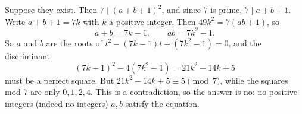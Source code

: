 Suppose they exist. Then $7\mid(a+b+1)^2$, and since $7$ is prime, $7\mid a+b+1$. Write $a+b+1=7k$ with $k$ a positive integer. Then $49k^2=7(ab+1)$, so
\[
a+b=7k-1,\qquad ab=7k^2-1 .
\]
So $a$ and $b$ are the roots of $t^2-(7k-1)t+(7k^2-1)=0$, and the discriminant
\[
(7k-1)^2-4(7k^2-1)=21k^2-14k+5
\]
must be a perfect square. But $21k^2-14k+5\equiv5\pmod7$, while the squares mod $7$ are only $0,1,2,4$. This is a contradiction, so the answer is $\boxed{\text{no}}$: no positive integers (indeed no integers) $a,b$ satisfy the equation.
